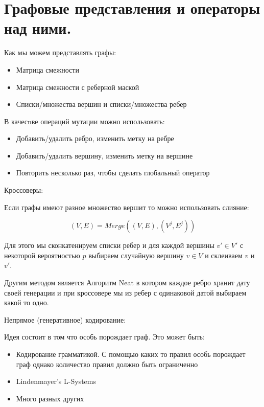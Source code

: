 \section{Графовые представления и операторы над ними.}

Как мы можем представлять графы:
\begin{itemize}
	\item Матрица смежности
	\item Матрица смежности с реберной маской
	\item Списки/множества вершин и списки/множества ребер
\end{itemize}
В качесnве операций мутации можно использовать:
\begin{itemize}
	\item Добавить/удалить ребро, изменить метку на ребре
	\item Добавить/удалить вершину, изменить метку на вершине
	\item Повторить несколько раз, чтобы сделать глобальный оператор
\end{itemize}

Кроссоверы:

Если графы имеют разное множество вершит то можно использовать слияние:

$$(V,E) = Merge((V,E),(V^j,E^j))$$

Для этого мы сконкатенируем списки ребер и для каждой вершины $v' \in V'$ с
некоторой вероятностью $p$ выбираем случайную вершину $v \in V$ и склеиваем $v$ и $v'$.

Другим методом является Алгоритм Neat в котором каждое ребро хранит дату своей генерации и при кроссовере мы из ребер с одинаковой датой выбираем какой то одно. 

Непрямое (генеративное) кодирование:

Идея состоит в том что особь порождает граф. Это может быть:
\begin{itemize}
	\item Кодирование грамматикой. С помощью каких то правил особь порождает граф однако количество правил должно быть ограниченно 
	\item Lindenmayer's L-Systems
	\item Много разных других
\end{itemize}

